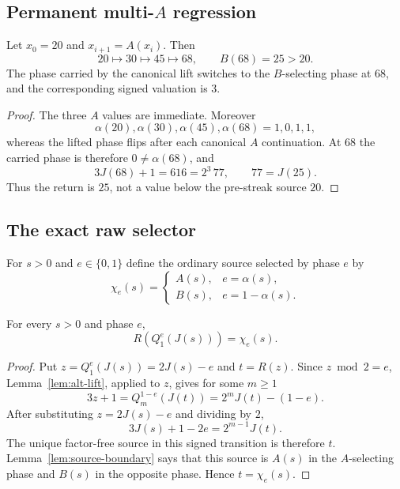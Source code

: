 \subsection{Permanent multi-$A$ regression}

\begin{lemma}\label{lem:anchor-stress}
Let $x_0=20$ and $x_{i+1}=A(x_i)$.  Then
\[
 20\longmapsto30\longmapsto45\longmapsto68,
 \qquad B(68)=25>20.
\]
The phase carried by the canonical lift switches to the $B$-selecting phase
at $68$, and the corresponding signed valuation is $3$.
\end{lemma}

\begin{proof}
The three $A$ values are immediate.  Moreover
\[
 \alpha(20),\alpha(30),\alpha(45),\alpha(68)=1,0,1,1,
\]
whereas the lifted phase flips after each canonical $A$ continuation.  At
$68$ the carried phase is therefore $0\ne\alpha(68)$, and
\[
 3J(68)+1=616=2^3\,77,
 \qquad 77=J(25).
\]
Thus the return is $25$, not a value below the pre-streak source $20$.
\end{proof}

\subsection{The exact raw selector}

For $s>0$ and $e\in\{0,1\}$ define the ordinary source selected by phase $e$
by
\[
 \chi_e(s)=
 \begin{cases}
   A(s),&e=\alpha(s),\\
   B(s),&e=1-\alpha(s).
 \end{cases}
\]

\begin{lemma}\label{lem:raw-selector}
For every $s>0$ and phase $e$,
\[
 \boxed{R\!\left(Q_1^e(J(s))\right)=\chi_e(s).}
\]
\end{lemma}

\begin{proof}
Put $z=Q_1^e(J(s))=2J(s)-e$ and $t=R(z)$.  Since
$z\bmod2=e$, Lemma~\ref{lem:alt-lift}, applied to $z$, gives for some
$m\ge1$
\[
 3z+1=Q_m^{1-e}(J(t))=2^mJ(t)-(1-e).
\]
After substituting $z=2J(s)-e$ and dividing by $2$,
\[
 3J(s)+1-2e=2^{m-1}J(t).
\]
The unique factor-free source in this signed transition is therefore $t$.
Lemma~\ref{lem:source-boundary} says that this source is $A(s)$ in the
$A$-selecting phase and $B(s)$ in the opposite phase.  Hence
$t=\chi_e(s)$.
\end{proof}

